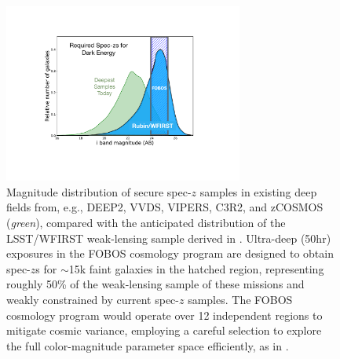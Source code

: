 \documentclass[11pt,a4paper,twoside,onecolumn,openany,final,oldfontcommands]{memoir}
\begin{document}

\begin{figure}
\begin{center}
\includegraphics[width=0.7\textwidth]{figs/fobos_cosmology_v2.pdf}
\end{center}
\caption{\footnotesize Magnitude distribution of secure spec-$z$ samples in existing deep fields from, e.g., DEEP2, VVDS, VIPERS, C3R2, and zCOSMOS (\textit{green}), compared with the anticipated distribution of the LSST/WFIRST weak-lensing sample derived in \citet[][\textit{blue}]{hemmati18}. Ultra-deep (50hr) exposures in the FOBOS cosmology program are designed to obtain spec-$z$s for $\sim$15k faint galaxies in the hatched region, representing roughly 50\% of the weak-lensing sample of these missions and weakly constrained by current spec-$z$ samples. The FOBOS cosmology program would operate over 12 independent regions to mitigate cosmic variance, employing a careful selection to explore the full color-magnitude parameter space efficiently, as in \cite{masters15}. }
\label{fig:cosmos_magdist}
\end{figure}
\end{document}
